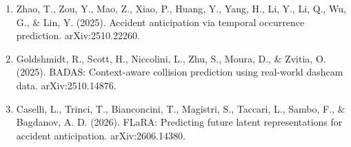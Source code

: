 \begin{enumerate}
\item
  Zhao, T., Zou, Y., Mao, Z., Xiao, P., Huang, Y., Yang, H., Li, Y., Li, Q., Wu, G., \& Lin, Y. (2025). Accident anticipation via temporal occurrence prediction. arXiv:2510.22260.
\item
  Goldshmidt, R., Scott, H., Niccolini, L., Zhu, S., Moura, D., \& Zvitia, O. (2025). BADAS: Context-aware collision prediction using real-world dashcam data. arXiv:2510.14876.
\item
  Caselli, L., Trinci, T., Bianconcini, T., Magistri, S., Taccari, L., Sambo, F., \& Bagdanov, A. D. (2026). FLaRA: Predicting future latent representations for accident anticipation. arXiv:2606.14380.
\end{enumerate}
